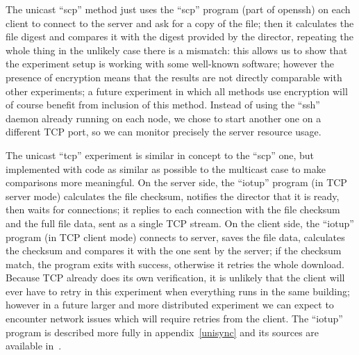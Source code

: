 \documentclass[a4paper,11pt,twocolumn]{article}
\begin{document}
The unicast ``scp'' method just uses the ``scp'' program (part of
openssh) on each client to connect to the server and ask for a copy of
the file; then it calculates the file digest and compares it with the
digest provided by the director, repeating the whole thing in the
unlikely case there is a mismatch: this allows us to show that the
experiment setup is working with some well-known software; however the
presence of encryption means that the results are not directly comparable
with other experiments; a future experiment in which all methods use
encryption will of course benefit from inclusion of this method.
Instead of using the ``ssh'' daemon already running on each node, we
chose to start another one on a different TCP port, so we can monitor
precisely the server resource usage.

The unicast ``tcp'' experiment is similar in concept to the ``scp''
one, but implemented with code as similar as possible to the multicast
case to make comparisons more meaningful.  On the server side, the
``iotup'' program (in TCP server mode) calculates the file checksum,
notifies the director that it is ready, then waits for connections;
it replies to each connection with the file checksum and the full file
data, sent as a single TCP stream.  On the client side, the ``iotup''
program (in TCP client mode) connects to server, saves the file data,
calculates the checksum and compares it with the one sent by the server;
if the checksum match, the program exits with success, otherwise it
retries the whole download. Because TCP already does its own verification,
it is unlikely that the client will ever have to retry in this experiment
when everything runs in the same building; however in a future larger and
more distributed experiment we can expect to encounter network issues
which will require retries from the client. The ``iotup'' program is
described more fully in appendix~\ref{unisync} and its sources are
available in~\cite{unisync:sources}.
\end{document}
